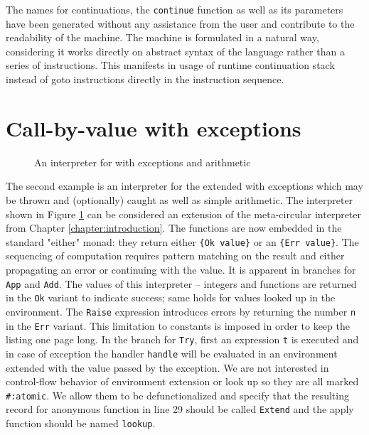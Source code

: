 The names for continuations, the \lstinline!continue! function as well as its parameters have been generated without any assistance from the user and contribute to the readability of the machine.
The machine is formulated in a natural way, considering it works directly on abstract syntax of the language rather than a series of instructions.
This manifests in usage of runtime continuation stack instead of goto instructions directly in the instruction sequence.

\section{Call-by-value \LC{} with exceptions}
\begin{figure}
  
  \caption{An interpreter for \LC{} with exceptions and arithmetic}
  \label{fig:studies-exceptions}
\end{figure}

The second example is an interpreter for the \LC{} extended with exceptions which may be thrown and (optionally) caught as well as simple arithmetic.
The interpreter shown in Figure \ref{fig:studies-exceptions} can be considered an extension of the meta-circular interpreter from Chapter \ref{chapter:introduction}.
The functions are now embedded in the standard "either" monad: they return either \lstinline!{Ok value}! or an \lstinline!{Err value}!.
The sequencing of computation requires pattern matching on the result and either propagating an error or continuing with the value.
It is apparent in branches for \lstinline!App! and \lstinline!Add!.
The values of this interpreter -- integers and functions are returned in the \lstinline!Ok! variant to indicate success; same holds for values looked up in the environment.
The \lstinline!Raise! expression introduces errors by returning the number \lstinline!n! in the \lstinline!Err! variant.
This limitation to constants is imposed in order to keep the listing one page long.
In the branch for \lstinline!Try!, first an expression \lstinline!t! is executed and in case of exception the handler \lstinline!handle! will be evaluated in an environment extended with the value passed by the exception.
We are not interested in control-flow behavior of environment extension or look up so they are all marked \lstinline!#:atomic!.
We allow them to be defunctionalized and specify that the resulting record for anonymous function in line 29 should be called \lstinline!Extend! and the apply function should be named \lstinline!lookup!.

